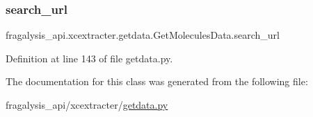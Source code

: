 \subsubsection{\texorpdfstring{search\+\_\+url}{search\_url}}
{\footnotesize\ttfamily fragalysis\+\_\+api.\+xcextracter.\+getdata.\+Get\+Molecules\+Data.\+search\+\_\+url}



Definition at line 143 of file getdata.\+py.



The documentation for this class was generated from the following file\+:\begin{DoxyCompactItemize}
\item 
fragalysis\+\_\+api/xcextracter/\hyperlink{getdata_8py}{getdata.\+py}\end{DoxyCompactItemize}
